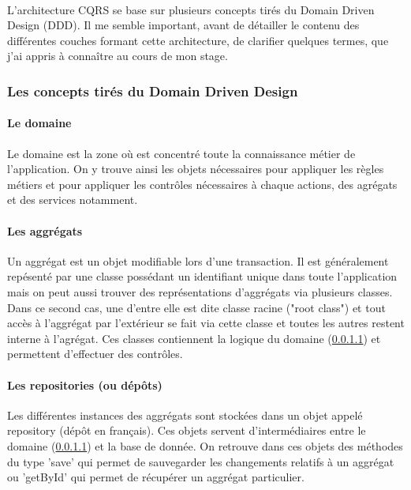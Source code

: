 \paragraph{}
L'architecture CQRS se base sur plusieurs concepts tirés du Domain Driven Design (DDD).
Il me semble important, avant de détailler le contenu des différentes couches formant cette architecture, de clarifier quelques termes, que j'ai appris à connaître au cours de mon stage.

\subsubsection{Les concepts tirés du Domain Driven Design}
\label{subs:Les concepts tirés du Domain Driven Design}
\paragraph{Le domaine}
\label{par:Le domaine}
Le domaine est la zone où est concentré toute la connaissance métier de l'application.
On y trouve ainsi les objets nécessaires pour appliquer les règles métiers et pour appliquer les contrôles nécessaires à chaque actions, des agrégats et des services notamment.
\paragraph{Les aggrégats}
\label{par:Les aggrégats}
Un aggrégat est un objet modifiable lors d'une transaction.
Il est généralement repésenté par une classe possédant un identifiant unique dans toute l'application mais on peut aussi trouver des représentations d'aggrégats via plusieurs classes.
Dans ce second cas, une d'entre elle est dite classe racine ("root class") et tout accès à l'aggrégat par l'extérieur se fait via cette classe et toutes les autres restent interne à l'agrégat.
Ces classes contiennent la logique du domaine (\ref{par:Le domaine}) et permettent d'effectuer des contrôles.
\paragraph{Les repositories (ou dépôts)}
\label{par:Les repositories (ou dépôts)}
Les différentes instances des aggrégats sont stockées dans un objet appelé repository (dépôt en français).
Ces objets servent d'intermédiaires entre le domaine (\ref{par:Le domaine}) et la base de donnée.
On retrouve dans ces objets des méthodes du type 'save' qui permet de sauvegarder les changements relatifs à un aggrégat ou 'getById' qui permet de récupérer un aggrégat particulier.


